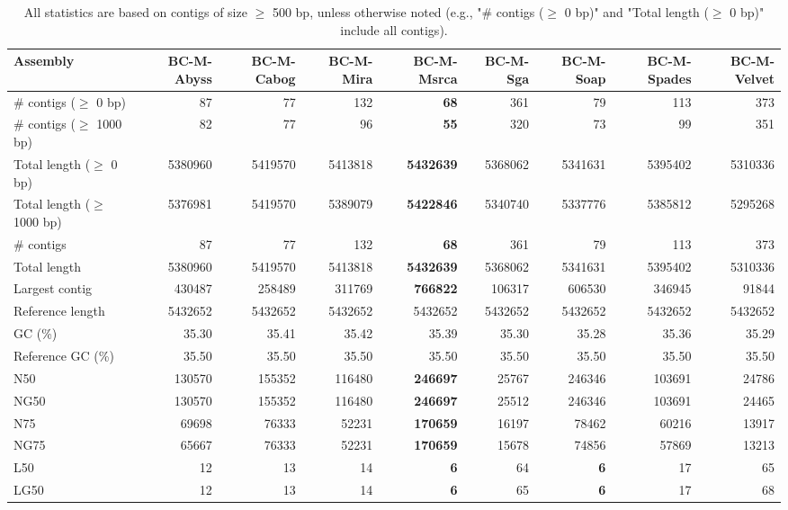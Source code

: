 \documentclass[12pt,a4paper]{article}
\begin{document}
\begin{table}[ht]
\begin{center}
\caption{All statistics are based on contigs of size $\geq$ 500 bp, unless otherwise noted (e.g., "\# contigs ($\geq$ 0 bp)" and "Total length ($\geq$ 0 bp)" include all contigs).}
\begin{tabular}{|l*{8}{|r}|}
\hline
Assembly & BC-M-Abyss & BC-M-Cabog & BC-M-Mira & BC-M-Msrca & BC-M-Sga & BC-M-Soap & BC-M-Spades & BC-M-Velvet \\ \hline
\# contigs ($\geq$ 0 bp) & 87 & 77 & 132 & {\bf 68} & 361 & 79 & 113 & 373 \\ \hline
\# contigs ($\geq$ 1000 bp) & 82 & 77 & 96 & {\bf 55} & 320 & 73 & 99 & 351 \\ \hline
Total length ($\geq$ 0 bp) & 5380960 & 5419570 & 5413818 & {\bf 5432639} & 5368062 & 5341631 & 5395402 & 5310336 \\ \hline
Total length ($\geq$ 1000 bp) & 5376981 & 5419570 & 5389079 & {\bf 5422846} & 5340740 & 5337776 & 5385812 & 5295268 \\ \hline
\# contigs & 87 & 77 & 132 & {\bf 68} & 361 & 79 & 113 & 373 \\ \hline
Total length & 5380960 & 5419570 & 5413818 & {\bf 5432639} & 5368062 & 5341631 & 5395402 & 5310336 \\ \hline
Largest contig & 430487 & 258489 & 311769 & {\bf 766822} & 106317 & 606530 & 346945 & 91844 \\ \hline
Reference length & 5432652 & 5432652 & 5432652 & 5432652 & 5432652 & 5432652 & 5432652 & 5432652 \\ \hline
GC (\%) & 35.30 & 35.41 & 35.42 & 35.39 & 35.30 & 35.28 & 35.36 & 35.29 \\ \hline
Reference GC (\%) & 35.50 & 35.50 & 35.50 & 35.50 & 35.50 & 35.50 & 35.50 & 35.50 \\ \hline
N50 & 130570 & 155352 & 116480 & {\bf 246697} & 25767 & 246346 & 103691 & 24786 \\ \hline
NG50 & 130570 & 155352 & 116480 & {\bf 246697} & 25512 & 246346 & 103691 & 24465 \\ \hline
N75 & 69698 & 76333 & 52231 & {\bf 170659} & 16197 & 78462 & 60216 & 13917 \\ \hline
NG75 & 65667 & 76333 & 52231 & {\bf 170659} & 15678 & 74856 & 57869 & 13213 \\ \hline
L50 & 12 & 13 & 14 & {\bf 6} & 64 & {\bf 6} & 17 & 65 \\ \hline
LG50 & 12 & 13 & 14 & {\bf 6} & 65 & {\bf 6} & 17 & 68 \\ \hline

\end{tabular}
\end{center}
\end{table}
\end{document}
